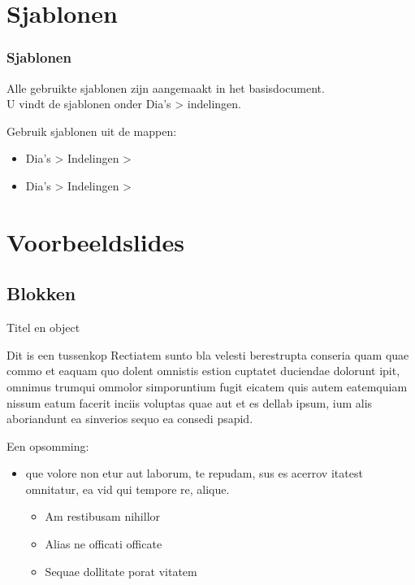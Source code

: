 \documentclass[showdate=true, slidenumbers=relative]{beamerruhuisstijl169}
\begin{document}
\section{Sjablonen}
\begin{frame}
    \frametitle{Sjablonen}

    \begin{block}{}
        Alle gebruikte sjablonen zijn aangemaakt in het basisdocument. \\
        U vindt de sjablonen onder Dia's > indelingen.
    \end{block}

    \begin{block}{}
        Gebruik sjablonen uit de mappen:
        \begin{itemize}
            \item Dia's > Indelingen > 
            \item Dia's > Indelingen > 
        \end{itemize}
    \end{block}


\end{frame}


\section{Voorbeeldslides}

\subsection{Blokken}
\begin{frame}{Titel en object}
    \begin{block}{Dit is een tussenkop}
        Rectiatem sunto bla velesti berestrupta conseria quam quae commo et eaquam quo dolent omnistis estion cuptatet duciendae dolorunt ipit, omnimus trumqui ommolor simporuntium fugit eicatem quis autem eatemquiam nissum eatum facerit inciis voluptas quae aut et es dellab ipsum, ium alis aboriandunt ea sinverios sequo ea consedi psapid.
    \end{block}

    \begin{block}{}
        Een opsomming:
        \begin{itemize}
            \item que volore non etur aut laborum, te repudam, sus es acerrov itatest omnitatur, ea vid qui tempore re, alique.
            \begin{itemize}
                \item Am restibusam nihillor
                \item Alias ne officati officate
                \item Sequae dollitate porat vitatem
            \end{itemize}
        \end{itemize}
    \end{block}
\end{frame}
\end{document}
